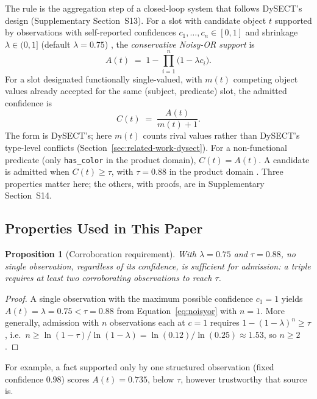 \documentclass[preprint,12pt,authoryear]{elsarticle}
\newtheorem{proposition}{Proposition}
\begin{document}
The rule is the aggregation step of a closed-loop system that follows
DySECT's design (Supplementary Section~S13). For a slot with candidate
object $t$ supported by observations with self-reported confidences
$c_1,\dots,c_n \in [0,1]$ and shrinkage $\lambda \in (0,1]$ (default
$\lambda=0.75$)
, the \emph{conservative Noisy-OR support} is
\begin{equation}
A(t) \;=\; 1 - \prod_{i=1}^{n} \bigl(1 - \lambda c_i\bigr).
\label{eq:noisyor}
\end{equation}
For a slot designated functionally single-valued, with $m(t)$ competing
object values already accepted for the same (subject, predicate) slot,
the admitted confidence is
\begin{equation}
C(t) \;=\; \frac{A(t)}{m(t) + 1}.
\label{eq:conflict}
\end{equation}
The form is DySECT's; here $m(t)$ counts rival values rather than
DySECT's type-level conflicts (Section~\ref{sec:related-work-dysect}).
For a non-functional predicate (only \texttt{has\_color} in the product
domain), $C(t) = A(t)$. A candidate is admitted when $C(t) \ge \tau$,
with $\tau=0.88$ in the product domain
. Three properties matter here; the others, with proofs, are in
Supplementary Section~S14.

\subsection{Properties Used in This Paper}
\label{sec:formal-analysis-properties}

\begin{proposition}[Corroboration requirement]
\label{prop:corroboration}
With $\lambda=0.75$ and $\tau=0.88$, no single observation, regardless of
its confidence, is sufficient for admission: a triple requires at least
two corroborating observations to reach $\tau$.
\end{proposition}
\begin{proof}
A single observation with the maximum possible confidence $c_1=1$ yields
$A(t) = \lambda = 0.75 < \tau = 0.88$ from Equation~\ref{eq:noisyor} with
$n=1$. More generally, admission with $n$ observations each at $c=1$
requires $1-(1-\lambda)^n \ge \tau$, i.e.\ $n \ge \ln(1-\tau)/\ln(1-\lambda)
= \ln(0.12)/\ln(0.25) \approx 1.53$, so $n \ge 2$.
\end{proof}
For example, a fact supported only by one structured observation (fixed
confidence $0.98$) scores $A(t) = 0.735$, below $\tau$, however
trustworthy that source is.
\end{document}
